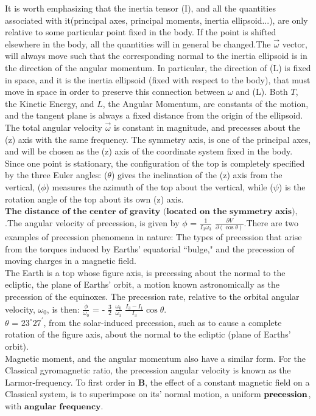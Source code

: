\documentclass[a4paper, 10pt, onepage]{elegantbook}
\begin{document}
{It is worth emphasizing that the inertia tensor (I), and all the quantities associated with it(principal axes, principal moments, inertia ellipsoid...), are only relative to some particular point fixed in the body. If the point is shifted elsewhere in the body, all the quantities will in general be changed.The $\vec{\omega}$ vector, will always move such that the corresponding normal to the inertia ellipsoid is in the direction of the angular momentum. In particular, the direction of (L) is fixed in space, and it is the inertia ellipsoid (fixed with respect to the body), that must move in space in order to preserve this connection between $\omega$ and (L). Both $\mathit{T}$, the Kinetic Energy, and $\mathit{L}$, the Angular Momentum, are constants of the motion, and the tangent plane is always a fixed distance from the origin of the ellipsoid. The total angular velocity $\vec{\omega}$ is constant in magnitude, and precesses about the (z) axis with the same frequency. The symmetry axis, is one of the principal axes, and will be chosen as the (z) axis of the coordinate system fixed in the body. Since one point is stationary, the configuration of the top is completely specified by the three Euler angles: ($\theta$) gives the inclination of the (z) axis from the vertical, ($\phi$) measures the azimuth of the top about the vertical, while ($\psi$) is the rotation angle of the top about its own (z) axis. $\mathbf{\textbf{The distance of the center of gravity (located on the symmetry axis), from the fixed point, will be denoted by (I).}}$.The angular velocity of precession, is given by $\dot \phi$ = $\frac{1}{\mathit I_3 \omega_3}$ $\frac{\partial V}{\partial (\cos \theta)}$.There are two examples of precession phenomena in nature: The types of precession that arise from the torques induced by Earths' equatorial “bulge," and the precession of moving charges in
a magnetic field.  \\
The Earth is a top whose figure axis, is precessing about the normal to the ecliptic, the plane of Earths' orbit, a motion known astronomically as the precession of the equinoxes. The precession rate, relative to the orbital angular velocity, $\omega_0$, is then: $\frac{\dot \phi}{\omega_0}$ = - $\frac{3}{2}$ $\frac{\omega_0}{\omega_3}$ $\frac{\mathit I_3 - \mathit I_1}{\mathit I_3} \cos \theta$.  \\
$\theta$ = $23^{\circ} 27^{\prime}$, from the solar-induced precession, such as to cause a complete rotation of the figure axis, about the normal to the ecliptic (plane of Earths' orbit).\\
Magnetic moment, and the angular momentum also have a similar form. For the Classical gyromagnetic ratio, the precession angular velocity is known as the Larmor-frequency. To first order in $\mathbf{\textbf{B}}$, the effect of a constant magnetic field on a Classical
system, is to superimpose on its' normal motion, a uniform $\mathbf{\textbf{precession\index{precession}}}$, with $\mathbf{\textbf{angular
frequency}}$.

}
\end{document}
